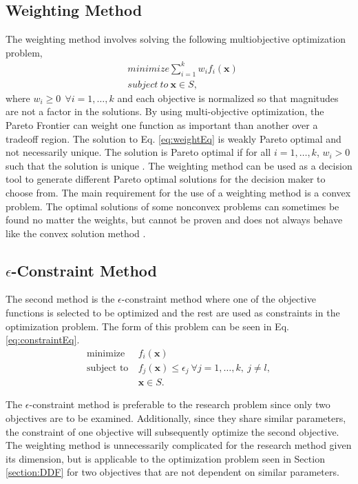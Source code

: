 \subsection*{Weighting Method}
The weighting method involves solving the following multiobjective optimization problem,
\begin{equation}
\begin{aligned}
    & minimize \sum^k_{i=1} w_if_i(\mathbf{x})\\
    & subject \ to \ \mathbf{x}\in S,
\end{aligned}
\label{eq:weightEq}
\end{equation}
where $w_i\geq 0 \ \ \forall i = 1,\dots,k$ and each objective is normalized so that magnitudes are not a factor in the solutions. By using multi-objective optimization, the Pareto Frontier can weight one function as important than another over a tradeoff region. The solution to Eq. \ref{eq:weightEq} is weakly Pareto optimal and not necessarily unique. The solution is Pareto optimal if for all $i = 1,\dots,k$, $w_i>0$ such that the solution is unique \cite{MultOptCS}. The weighting method can be used as a decision tool to generate different Pareto optimal solutions for the decision maker to choose from. The main requirement for the use of a weighting method is a convex problem. The optimal solutions of some nonconvex problems can sometimes be found no matter the weights, but cannot be proven and does not always behave like the convex solution method \cite{MultOptCS}.\par
\subsection*{$\epsilon$-Constraint Method}
The second method is the $\epsilon$-constraint method where one of the objective functions is selected to be optimized and the rest are used as constraints in the optimization problem. The form of this problem can be seen in Eq. \ref{eq:constraintEq}.
\begin{equation}
    \begin{aligned}
    \text{minimize} \ & f_i(\mathbf{x})\\
    \text{subject to} \ & f_j(\mathbf{x})\leq \epsilon_j \ \forall j = 1,\dots,k, \ j\neq l,\\
    & \mathbf{x}\in S.
    \end{aligned}
    \label{eq:constraintEq}
\end{equation}
\par
The $\epsilon$-constraint method is preferable to the research problem since only two objectives are to be examined. Additionally, since they share similar parameters, the constraint of one objective will subsequently optimize the second objective. The weighting method is unnecessarily complicated for the research method given its dimension, but is applicable to the optimization problem seen in Section \ref{section:DDF} for two objectives that are not dependent on similar parameters.

